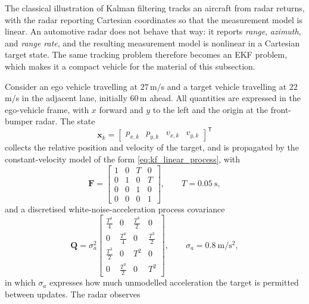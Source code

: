 \begin{example}
\label{ex:ekf-radar-cutin}
The classical illustration of Kalman filtering tracks an aircraft from radar
returns, with the radar reporting Cartesian coordinates so that the measurement
model is linear. An automotive radar does not behave that way: it reports
\emph{range}, \emph{azimuth}, and \emph{range rate}, and the resulting
measurement model is nonlinear in a Cartesian target state. The same tracking
problem therefore becomes an EKF problem, which makes it a compact vehicle for
the material of this subsection.

Consider an ego vehicle travelling at $27$\,m/s and a target vehicle travelling
at $22$\,m/s in the adjacent lane, initially $60$\,m ahead. All quantities are
expressed in the ego-vehicle frame, with $x$ forward and $y$ to the left and the
origin at the front-bumper radar. The state
\begin{equation}
\mathbf{x}_k=
\begin{bmatrix}
p_{x,k} & p_{y,k} & v_{x,k} & v_{y,k}
\end{bmatrix}^{\mathsf T}
\end{equation}
collects the relative position and velocity of the target, and is propagated by
the constant-velocity model of the form
\eqref{eq:kf_linear_process}, with
\begin{equation}
\mathbf{F}=
\begin{bmatrix}
1&0&T&0\\
0&1&0&T\\
0&0&1&0\\
0&0&0&1
\end{bmatrix},
\qquad T=0.05\ \mathrm{s},
\end{equation}
and a discretised white-noise-acceleration process covariance
\begin{equation}
\mathbf{Q}=\sigma_a^{2}
\begin{bmatrix}
\tfrac{T^{4}}{4}&0&\tfrac{T^{3}}{2}&0\\[2pt]
0&\tfrac{T^{4}}{4}&0&\tfrac{T^{3}}{2}\\[2pt]
\tfrac{T^{3}}{2}&0&T^{2}&0\\[2pt]
0&\tfrac{T^{3}}{2}&0&T^{2}
\end{bmatrix},
\qquad \sigma_a=0.8\ \mathrm{m/s^{2}},
\end{equation}
in which $\sigma_a$ expresses how much unmodelled acceleration the target is
permitted between updates. The radar observes
\begin{equation}

\end{equation}
\end{example}
